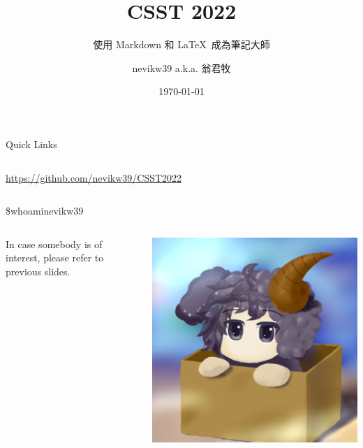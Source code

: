 \documentclass[mathserif]{beamer}
\title[使用 Markdown 和 \LaTeX\ 成為筆記大師]{CSST 2022}
\subtitle{使用 Markdown 和 \LaTeX\ 成為筆記大師}
\author[nevikw39]{nevikw39 a.k.a. 翁君牧}
\institute[CSST]{清華資工系學會教學股 \and CSST 2022 籌備團隊}
\date{\today}
\begin{document}
\frame{\titlepage}

\frame{\tableofcontents}

\begin{frame}{Quick Links}

\begin{columns}


\color{nthu}
\url{https://github.com/nevikw39/CSST2022}



\end{columns}

\end{frame}

\begin{frame}{\ttfamily \$whoami}{nevikw39}

\begin{columns}


In case somebody is of interest, please refer to previous slides.


\includegraphics[width=\linewidth]{nevikw39}

\end{columns}

\end{frame}
\end{document}
